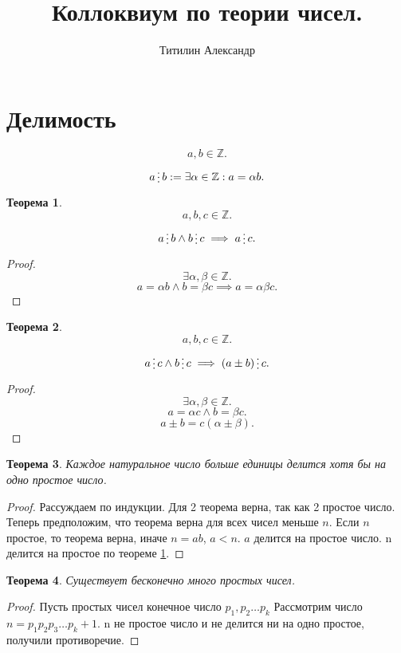 \documentclass{scrarticle}
\title{Коллоквиум по теории чисел.}
\author{Титилин Александр}
\date{}
\newtheorem{theorem}{Теорема}
\newcommand{\divisible}{\mathop{\raisebox{-2pt}{\vdots}}}
\begin{document}
    \maketitle
    \section{Делимость}
    \[
    a , b \in \mathbb{Z}
    .\] 
    \[
    a \divisible b := \exists \alpha \in \mathbb{Z} : a = \alpha b
    .\] 
    \begin{theorem} \label{1}
        \[
        a,b,c\in \mathbb{Z}
        .\] 
        \[
        a \divisible b \land b \divisible c \implies a \divisible c
        .\] 
    \end{theorem}
    \begin{proof}
        \[
        \exists \alpha , \beta \in \mathbb{Z}
        .\] 
        \[
        a = \alpha b \land b = \beta c \implies a = \alpha \beta c
        .\] 
    \end{proof}
    \begin{theorem} \label{2}
        \[
        a,b,c \in \mathbb{Z}
        .\] 
        \[
        a \divisible c \land b \divisible c \implies
        (a \pm b) \divisible c
        .\] 
    \end{theorem}
    \begin{proof}
        \[
        \exists \alpha , \beta \in \mathbb{Z}
        .\] 
        \[
        a = \alpha c \land b = \beta c
        .\] 
        \[
        a \pm b = c(\alpha \pm \beta)
        .\] 
    \end{proof}
    \begin{theorem} \label{3}
        Каждое натуральное число больше единицы делится хотя бы на одно простое число.
    \end{theorem}
    \begin{proof}
        Рассуждаем по индукции. Для 2 теорема верна, так как 2 простое число. Теперь предположим, что теорема верна для всех чисел меньше $n$. Если  $n$ простое, то теорема верна, иначе $n = ab$,  $a < n$.  $a$ делится на простое число. n делится на простое по теореме \ref{1}.
    \end{proof}
    \begin{theorem}
        Существует бесконечно много простых чисел.
    \end{theorem}
    \begin{proof}
        Пусть простых чисел конечное число $p_1,p_2\dots p_k$ 
        Рассмотрим число $n = p_1 p_2 p_3 \dots p_k + 1$. n не простое число и не делится ни на одно простое, получили противоречие.
    \end{proof}
\end{document}
